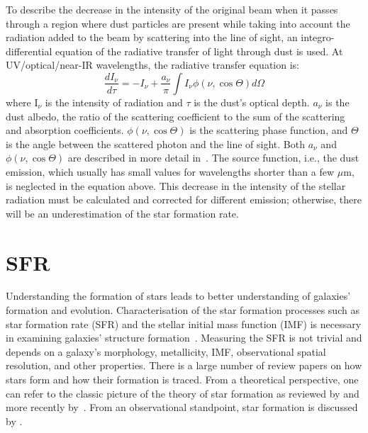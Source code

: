 To describe the decrease in the intensity of the original beam when it passes through a region where dust particles are present while taking into account the radiation added to the beam by scattering into the line of sight, an integro-differential equation of the radiative transfer of light through dust is used. %
At UV/optical/near-IR wavelengths, the radiative transfer equation is: %
\begin{equation}
\frac{dI_{\nu}}{d\tau} = -I_{\nu}  + \frac{a_{\nu}}{\pi} \int I_{\nu}\phi(\nu,\cos \Theta)d\Omega
\end{equation}
where I$_{\nu}$ is the intensity of radiation and $\tau$ is the dust's optical depth.
$a_{\nu}$ is the dust albedo,  the ratio of the scattering coefficient to the sum of the scattering and absorption coefficients. 
$\phi(\nu,\cos \Theta)$ is the scattering phase function, and $\Theta$ is the angle between the scattered photon and the line of sight. %
Both $a_{\nu}$ and $\phi(\nu,\cos \Theta)$ are described in more detail in~\citep{Draine03}. 
The source function, i.e., the dust emission, which usually has small values for wavelengths shorter than a few $\mu$m, is neglected in the equation above. %
This decrease in the intensity of the stellar radiation must be calculated and corrected for different emission; otherwise, there will be an underestimation of the star formation rate. %


\section{SFR}
\label{sec: sfr_intro}
Understanding the formation of stars leads to better understanding of galaxies' formation and evolution. 
Characterisation of the star formation processes such as star formation rate (SFR) and the stellar initial mass function (IMF) is necessary in examining galaxies' structure formation~\citep{McKee07}. 
Measuring the SFR is not trivial and depends on a galaxy's morphology, metallicity, IMF, observational spatial resolution, and other properties. 
There is a large number of review papers on how stars form and how their formation is traced. 
From a theoretical perspective, one can refer to the classic picture of the theory of star formation as reviewed by \cite{Shu87} and more recently by~\citep{McKee07}. 
From an observational standpoint, star formation is discussed by \cite[][and references therein]{Kennicutt98b, Kewley02, Calzetti13, Boquien10, Kennicutt12}.

